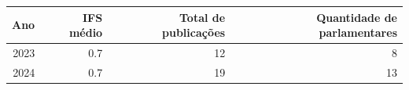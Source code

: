 \begin{tabular}{rrrr}
\toprule
Ano & IFS médio & Total de publicações & Quantidade de parlamentares \\
\midrule
2023 & 0.7 & 12 & 8 \\
2024 & 0.7 & 19 & 13 \\
\bottomrule
\end{tabular}

